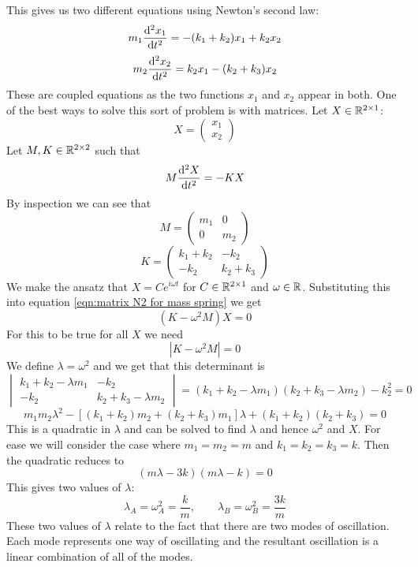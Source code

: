 \documentclass{article}
\begin{document}
    This gives us two different equations using Newton's second law:
    \[m_1\dv[2]{x_1}{t} = -(k_1 + k_2)x_1 + k_2x_2\]
    \[m_2\dv[2]{x_2}{t} = k_2 x_1 - (k_2 + k_3)x_2\]
    These are coupled equations as the two functions \(x_1\) and \(x_2\) appear in both.
    One of the best ways to solve this sort of problem is with matrices.
    Let \(X\in\mathbb{R}^{2\times 1}\):
    \[X = \begin{pmatrix} x_1 \\ x_2 \end{pmatrix}\]
    Let \(M, K\in\mathbb{R}^{2\times 2}\) such that
    \begin{equation}\label{eqn:matrix N2 for mass spring}
        M\dv[2]{X}{t} = -KX
    \end{equation}
    By inspection we can see that
    \[
        M = 
        \begin{pmatrix}
            m_1 & 0 \\ 0 & m_2
        \end{pmatrix}
    \]
    \[
        K = 
        \begin{pmatrix}
            k_1 + k_2 & -k_2 \\ -k_2 & k_2 + k_3
        \end{pmatrix}
    \]
    We make the ansatz that \(X = Ce^{i\omega t}\) for \(C\in\mathbb{R}^{2\times 1}\) and \(\omega\in\mathbb{R}\).
    Substituting this into equation \ref{eqn:matrix N2 for mass spring} we get
    \[(K - \omega^2M)X = 0\]
    For this to be true for all \(X\) we need
    \[|K-\omega^2 M| = 0\]
    We define \(\lambda = \omega^2\) and we get that this determinant is
    \[
        \begin{vmatrix}
            k_1 + k_2 - \lambda m_1 & -k_2\\
            -k_2 & k_2 + k_3 - \lambda m_2
        \end{vmatrix}
        = (k_1 + k_2 - \lambda m_1)(k_2 + k_3 - \lambda m_2) - k_2^2 = 0
    \]
    \[m_1m_2\lambda^2 - [(k_1 + k_2)m_2 + (k_2 + k_3)m_1]\lambda + (k_1 + k_2)(k_2 + k_3) = 0\]
    This is a quadratic in \(\lambda\) and can be solved to find \(\lambda\) and hence \(\omega^2\) and \(X\).
    For ease we will consider the case where \(m_1 = m_2 = m\) and \(k_1 = k_2 = k_3 = k\).
    Then the quadratic reduces to
    \[(m\lambda - 3k)(m\lambda - k) = 0\]
    This gives two values of \(\lambda\):
    \[\lambda_A = \omega_A^2 = \frac{k}{m},\qquad \lambda_B = \omega_B^2 = \frac{3k}{m}\]
    These two values of \(\lambda\) relate to the fact that there are two modes of oscillation.
    Each mode represents one way of oscillating and the resultant oscillation is a linear combination of all of the modes.
    
\end{document}
